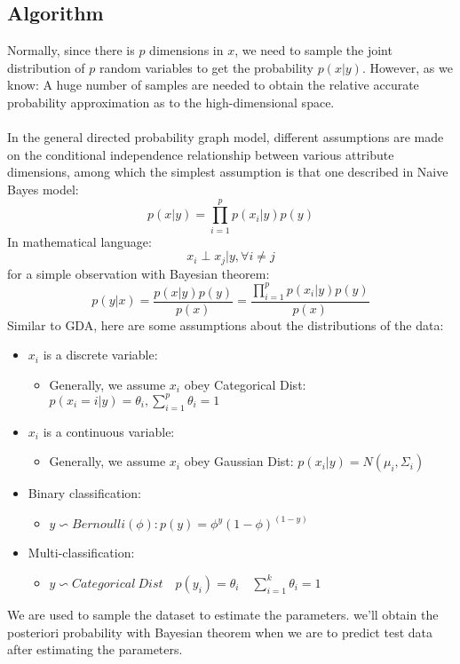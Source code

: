 \documentclass{report}
\begin{document}
\subsection{Algorithm}
Normally, since there is $p$ dimensions in $x$, we need to sample the joint distribution of $p$ random variables to get the probability $p(x|y)$. However, as we know: A huge number of samples are needed to obtain the relative accurate probability approximation as to the high-dimensional space.\\\\
In the general directed probability graph model, different assumptions are made on the conditional independence relationship between various attribute dimensions, among which the simplest assumption is that one described in Naive Bayes model:
$$
p(x|y)=\prod_{i=1}^p p(x_i|y)p(y)
$$
In mathematical language:
$$
x_{i} \perp x_{j} | y, \forall i \neq j
$$
for a simple observation with Bayesian theorem:
$$
p(y|x)=\frac{p(x|y)p(y)}{p(x)}=\frac{\prod_{i=1}^p p(x_i|y)p(y)}{p(x)}
$$
Similar to GDA, here are some assumptions about the distributions of the data:
\begin{itemize}
	\item $x_i$ is a discrete variable:
	\begin{itemize}
	\item Generally, we assume $x_i$ obey Categorical Dist: $p(x_i=i|y)=\theta_i,\sum_{i=1}^p \theta_i =1$
	\end{itemize}
	\item $x_i$ is a continuous variable:
	\begin{itemize}
	\item Generally, we assume $x_i$ obey Gaussian Dist: $p(x_i|y)=N(\mu_i, \Sigma_i)$
	\end{itemize}
\end{itemize}
\begin{itemize}
	\item Binary classification:
	\begin{itemize}
	\item $y \backsim Bernoulli(\phi):p(y)=\phi^y (1-\phi)^{(1-y)}$ 
	\end{itemize}
	\item Multi-classification:
	\begin{itemize}
	\item $y \backsim Categorical\ Dist\quad p(y_i)=\theta_i\quad \sum_{i=1}^k \theta_i=1$
	\end{itemize}
\end{itemize}
We are used to sample the dataset to estimate the parameters. we'll obtain the posteriori probability with Bayesian theorem when we are to predict test data after estimating the parameters.
\end{document}
